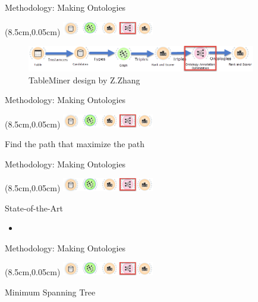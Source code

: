 \documentclass{beamer}
\begin{document}
\begin{frame}{Methodology: Making Ontologies}
	\begin{textblock*}{4cm}(8.5cm,0.05cm) %
		\includegraphics[width=4cm]{images/header-opt.png}
	\end{textblock*}
	\begin{figure}
		\includegraphics[width=10cm]{images/diagrams-opt.png}
		\caption{\label{fig:your-figure2} TableMiner design by Z.Zhang}
	\end{figure}
\end{frame}
\begin{frame}{Methodology: Making Ontologies}
	\begin{textblock*}{4cm}(8.5cm,0.05cm) %
		\includegraphics[width=4cm]{images/header-opt.png}
	\end{textblock*}
	\begin{definition}[Optimizer]
		Find the path that maximize the path
	\end{definition}
\end{frame}
\begin{frame}{Methodology: Making Ontologies}
	\begin{textblock*}{4cm}(8.5cm,0.05cm) %
		\includegraphics[width=4cm]{images/header-opt.png}
	\end{textblock*}
	State-of-the-Art
	\begin{itemize}
		\item 
	\end{itemize}
\end{frame}
\begin{frame}{Methodology: Making Ontologies}
	\begin{textblock*}{4cm}(8.5cm,0.05cm) %
		\includegraphics[width=4cm]{images/header-opt.png}
	\end{textblock*}
	Minimum Spanning Tree
\end{frame}
\end{document}
